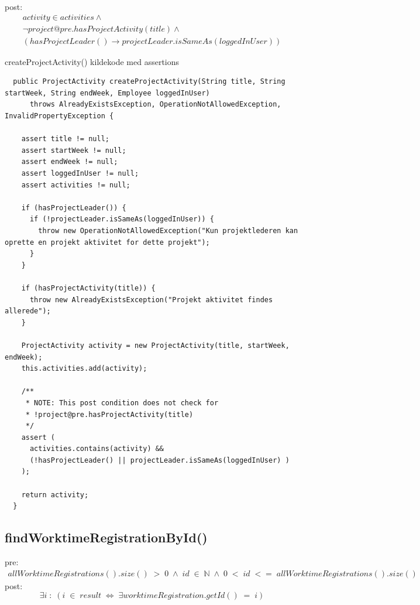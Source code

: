 post: 
\begin{equation}
\begin{gathered}
    activity \in activities \wedge \\
    \neg project@pre.hasProjectActivity(title) \wedge \\
    (hasProjectLeader() \to projectLeader.isSameAs(loggedInUser))
\end{gathered}
\end{equation}

\begin{listing}[H]
    \centering
    \caption{createProjectActivity() kildekode med assertions}\label{lst:create_project_activity_assertions}
    \begin{verbatim}
  public ProjectActivity createProjectActivity(String title, String startWeek, String endWeek, Employee loggedInUser)
      throws AlreadyExistsException, OperationNotAllowedException, InvalidPropertyException {

    assert title != null;
    assert startWeek != null;
    assert endWeek != null;
    assert loggedInUser != null;
    assert activities != null;

    if (hasProjectLeader()) {
      if (!projectLeader.isSameAs(loggedInUser)) {
        throw new OperationNotAllowedException("Kun projektlederen kan oprette en projekt aktivitet for dette projekt");
      }
    }

    if (hasProjectActivity(title)) {
      throw new AlreadyExistsException("Projekt aktivitet findes allerede");
    }

    ProjectActivity activity = new ProjectActivity(title, startWeek, endWeek);
    this.activities.add(activity);

    /**
     * NOTE: This post condition does not check for 
     * !project@pre.hasProjectActivity(title)
     */
    assert (
      activities.contains(activity) &&
      (!hasProjectLeader() || projectLeader.isSameAs(loggedInUser) )
    );

    return activity;
  }
    \end{verbatim}
\end{listing}


\subsection{findWorktimeRegistrationById()} \label{sec:contract_findd_work}
\noindent pre: 
\begin{align}
    allWorktimeRegistrations().size()\; >\; 0 \;\wedge\; id \; \in \; \mathbb{N} \; \wedge \; 0 \; < \; id  \; <=\; allWorktimeRegistrations().size()
\end{align}
post: 
\begin{equation}
    \exists i\; :\; (i\; \in\; result\; \iff\; \exists worktimeRegistration.getId() \; = \; i)
\end{equation}

